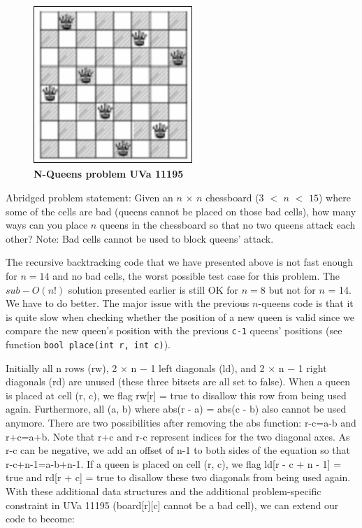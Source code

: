 \begin{figure}[h]
    \centering
\includegraphics[width=6cm, height=6cm]{n-queen-problem.png}
 \caption{\textbf{N-Queens problem UVa 11195}}
    \label{fig:n-queen-problem}
\end{figure}

Abridged problem statement: Given an $n$ × $n$ chessboard ($3$ $<$ $n$ $<$ $15$) where some of the cells are bad (queens cannot be placed on those bad cells), how many ways can you place $n$ queens in the chessboard so that no two queens attack each other? Note: Bad cells cannot be used to block queens’ attack.

\hspace{7mm}The recursive backtracking code that we have presented above is not fast enough for $n = 14$ and no bad cells, the worst possible test case for this problem. The $sub-O(n!)$ solution presented earlier is still OK for $n = 8$ but not for $n$ = 14. We have to do better. The major issue with the previous $n$-queens code is that it is quite slow when checking whether the position of a new queen is valid since we compare the new queen’s position with the previous \lstinline|c-1| queens’ positions (see function \lstinline|bool place(int r, int c)|).

\hspace{7mm}Initially all n rows (rw), 2 × n − 1 left diagonals (ld), and 2 × n − 1 right diagonals (rd) are unused (these three bitsets are all set to false). When a queen is placed at cell (r, c), we flag rw[r] = true to disallow this row from being used again. Furthermore, all (a, b) where abs(r - a) = abs(c - b) also cannot be used anymore. There are two possibilities after removing the abs function: r-c=a-b and r+c=a+b. Note that r+c and r-c represent indices for the two diagonal axes. As r-c can be negative, we add an offset of n-1 to both sides of the equation so that r-c+n-1=a-b+n-1. If a queen is placed on cell (r, c), we flag ld[r - c + n - 1] = true and rd[r + c] = true to disallow these two diagonals from being used again. With these additional data structures and the additional problem-specific constraint in UVa 11195 (board[r][c] cannot be a bad cell), we can extend our code to become:

